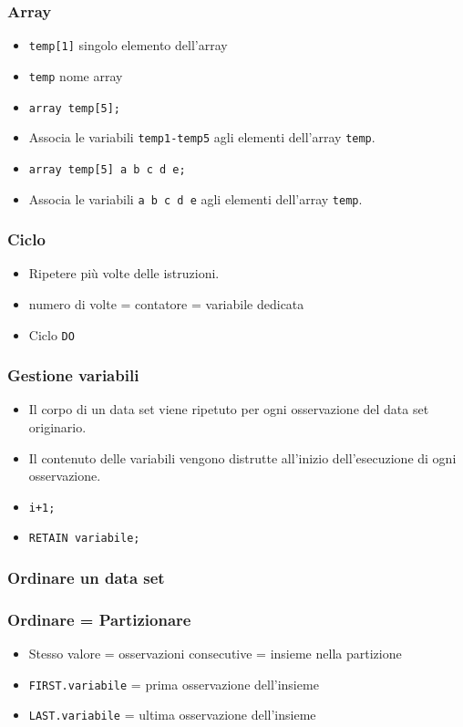 \begin{frame}[containsverbatim]\frametitle{Array}
  \begin{itemize}
  \item
    \texttt{temp[1]} singolo elemento dell'array
  \item
    \texttt{temp} nome array
  \item
    \verb!array temp[5];!
  \item
    Associa le variabili \verb!temp1-temp5! agli elementi dell'array \verb!temp!.
  \item
    \verb!array temp[5] a b c d e;!
  \item
    Associa le variabili \verb!a b c d e! agli elementi dell'array \verb!temp!.
  \end{itemize}\end{frame}


\begin{frame}[containsverbatim]\frametitle{Ciclo}
  \begin{itemize}
  \item
    Ripetere pi{\`u} volte delle istruzioni.
  \item
    numero di volte = contatore = variabile dedicata
  \item
    Ciclo \verb+DO+
  \end{itemize}
\end{frame}



\begin{frame}[containsverbatim]\frametitle{Gestione variabili}
  \begin{itemize}
  \item
    Il corpo di un data set viene ripetuto per ogni osservazione del data set originario.
  \item
    Il contenuto delle variabili vengono distrutte all'inizio dell'esecuzione di ogni osservazione.
  \item
    \verb!i+1;!
  \item
    \verb!RETAIN variabile;!
  \end{itemize}\end{frame}



\begin{frame}[containsverbatim]\frametitle{Ordinare un data set}
\end{frame}

\begin{frame}\frametitle{Ordinare = Partizionare}
  \begin{itemize}
  \item
    Stesso valore = osservazioni consecutive = insieme nella partizione
  \item
    \texttt{FIRST.variabile} =
    prima osservazione dell'insieme
  \item
    \texttt{LAST.variabile} =
    ultima osservazione dell'insieme
  \end{itemize}\end{frame}

